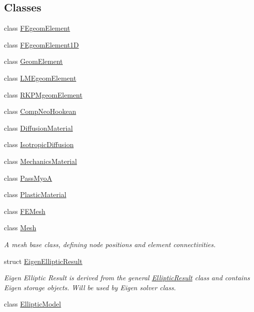 \subsection*{Classes}
\begin{DoxyCompactItemize}
\item 
class \hyperlink{classvoom_1_1_f_egeom_element}{FEgeomElement}
\item 
class \hyperlink{classvoom_1_1_f_egeom_element1_d}{FEgeomElement1D}
\item 
class \hyperlink{classvoom_1_1_geom_element}{GeomElement}
\item 
class \hyperlink{classvoom_1_1_l_m_egeom_element}{LMEgeomElement}
\item 
class \hyperlink{classvoom_1_1_r_k_p_mgeom_element}{RKPMgeomElement}
\item 
class \hyperlink{classvoom_1_1_comp_neo_hookean}{CompNeoHookean}
\item 
class \hyperlink{classvoom_1_1_diffusion_material}{DiffusionMaterial}
\item 
class \hyperlink{classvoom_1_1_isotropic_diffusion}{IsotropicDiffusion}
\item 
class \hyperlink{classvoom_1_1_mechanics_material}{MechanicsMaterial}
\item 
class \hyperlink{classvoom_1_1_pass_myo_a}{PassMyoA}
\item 
class \hyperlink{classvoom_1_1_plastic_material}{PlasticMaterial}
\item 
class \hyperlink{classvoom_1_1_f_e_mesh}{FEMesh}
\item 
class \hyperlink{classvoom_1_1_mesh}{Mesh}
\begin{DoxyCompactList}\small\item\em A mesh base class, defining node positions and element connectivities. \item\end{DoxyCompactList}\item 
struct \hyperlink{structvoom_1_1_eigen_elliptic_result}{EigenEllipticResult}
\begin{DoxyCompactList}\small\item\em Eigen Elliptic Result is derived from the general \hyperlink{structvoom_1_1_elliptic_result}{EllipticResult} class and contains Eigen storage objects. Will be used by Eigen solver class. \item\end{DoxyCompactList}\item 
class \hyperlink{classvoom_1_1_elliptic_model}{EllipticModel}

\end{DoxyCompactItemize}
